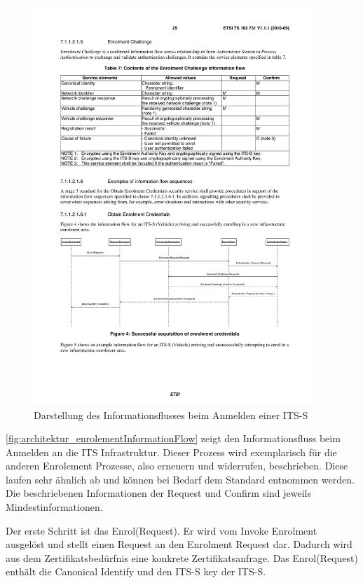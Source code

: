 \begin{figure}[h]
	\includegraphics[width=0.95\textwidth]{content/images/02_architektur/enrolementFlowDiagramm.pdf}
	\caption{Darstellung des Informationsflusses beim Anmelden einer \ac{ITS-S} \cite{ts102731}}
	\label{fig:architektur_enrolementInformationFlow}
\end{figure}

\autoref{fig:architektur_enrolementInformationFlow} zeigt den Informationsfluss beim Anmelden an die \ac{ITS} Infrastruktur. Dieser Prozess wird exemplarisch für die anderen Enrolement Prozesse, also erneuern und widerrufen, beschrieben. Diese laufen sehr ähnlich ab und können bei Bedarf dem Standard \cite{ts102731} entnommen werden. Die beschriebenen Informationen der Request und Confirm sind jeweils Mindestinformationen. 

Der erste Schritt ist das Enrol(Request). Er wird vom Invoke Enrolment ausgelöst und stellt einen Request an den Enrolment Request dar. Dadurch wird aus dem Zertifikatsbedürfnis eine konkrete Zertifikatsanfrage. Das Enrol(Request) enthält die Canonical Identify und den \ac{ITS-S} key der \ac{ITS-S}.  

